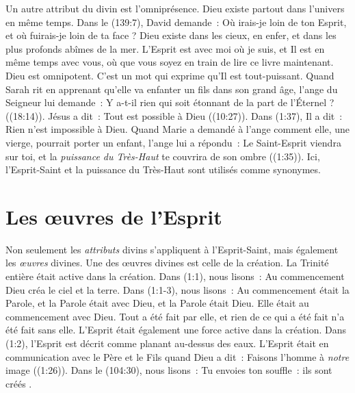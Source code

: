 Un autre attribut du divin est l'omniprésence. Dieu existe partout dans
 l'univers en même temps. Dans le (139:7), David demande~:
 \og Où irais-je loin de ton Esprit, et où fuirais-je loin de ta face ? \fg{}
 Dieu existe dans les cieux, en enfer, et dans les plus profonds abîmes de
 la mer. L'Esprit est avec moi où je suis, et Il est en même temps avec vous,
 où que vous soyez en train de lire ce livre maintenant. Dieu est omnipotent.
 C'est un mot qui exprime qu'Il est tout-puissant. Quand Sarah rit en apprenant
 qu'elle va enfanter un fils dans son grand âge, l'ange du Seigneur lui demande~:
 \og Y a-t-il rien qui soit étonnant de la part de l'Éternel ? \fg{}
 ((18:14)). Jésus a dit~: \og Tout est possible à Dieu \fg{}
 ((10:27)). Dans (1:37), Il a dit~:
 \og Rien n'est impossible à Dieu. \fg{} Quand Marie a demandé à l'ange comment
 elle, une vierge, pourrait porter un enfant, l'ange lui a répondu~:
 \og Le Saint-Esprit viendra sur toi, et la \emph{puissance du Très-Haut} te couvrira
 de son ombre \fg{} ((1:35)). Ici, l'Esprit-Saint et
 la puissance du Très-Haut sont utilisés comme synonymes.

\section*{Les œuvres de l'Esprit}


Non seulement les \emph{attributs} divins s'appliquent à l'Esprit-Saint, mais
 également les \emph{œuvres} divines.
 Une des œuvres divines est celle de la création.
 La Trinité entière était active dans la création.
 Dans (1:1), nous lisons~:
 \og Au commencement Dieu créa le ciel et la terre. \fg{}
 Dans (1:1-3), nous lisons~:
 \og Au commencement était la Parole, et la Parole était avec Dieu,
 et la Parole était Dieu. Elle était au commencement avec Dieu.
 Tout a été fait par elle, et rien de ce qui a été fait n'a été fait
 sans elle. \fg{}
 L'Esprit était également une force active dans la création.
 Dans (1:2), l'Esprit est décrit comme planant au-dessus
 des eaux. L'Esprit était en communication avec le Père et le Fils quand
 Dieu a dit~: \og Faisons l'homme à \emph{notre} image \fg{} ((1:26)).
 Dans le (104:30), nous lisons~:
 \og Tu envoies ton souffle~: ils sont créés \fg{}
 .

